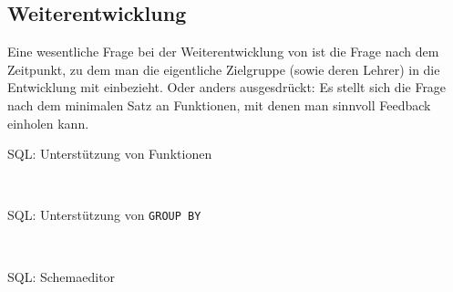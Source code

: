 \subsection{Weiterentwicklung}

Eine wesentliche Frage bei der Weiterentwicklung von \idename{} ist die Frage nach dem Zeitpunkt, zu dem man die eigentliche Zielgruppe (sowie deren Lehrer) in die Entwicklung mit einbezieht. Oder anders ausgesdrückt: Es stellt sich die Frage nach dem minimalen Satz an Funktionen, mit denen man sinnvoll Feedback einholen kann.

\begin{description}
\item[SQL: Unterstützung von Funktionen] \hfill\\

\item[SQL: Unterstützung von \texttt{GROUP BY}] \hfill\\

\item[SQL: Schemaeditor] \hfill\\
  
\end{description}




